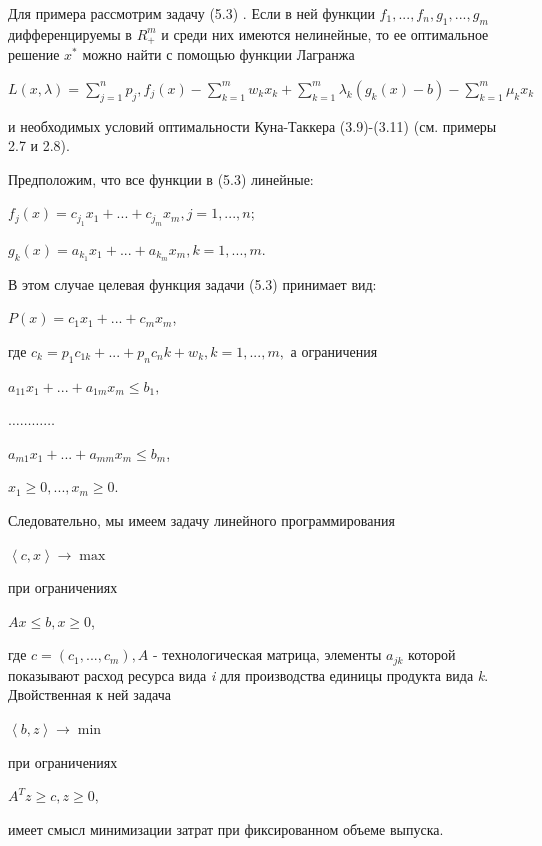 \documentclass[12pt, 4paper]{book}
\begin{document}
{Для примера рассмотрим задачу (5.3) . Если в ней функции $f_1,...,f_n,g_1,...,g_m$ дифференцируемы в $R_{+}^{m}$ и среди них имеются нелинейные, то ее оптимальное решение $x^{*}$ можно найти с помощью функции Лагранжа 
\begin{center}
$L(x,\lambda)=\sum\limits_{j=1}^{n}p_j,f_j(x) - \sum\limits_{k=1}^{m}w_k x_k + \sum\limits_{k=1}^{m}\lambda_k (g_k(x)-b)-\sum\limits_{k=1}^{m}\mu_k x_k$
\end{center}
и необходимых условий оптимальности Куна-Таккера (3.9)-(3.11) (см. примеры 2.7 и 2.8). 
\par

Предположим, что все функции в (5.3) линейные: 
\begin{center}
$f_j(x)=c_{j_1}x_1 + ... + c_{j_m} x_m,j=1,...,n$;
\end{center}
\begin{center}
$g_k(x)=a_{k_1}x_1 + ... + a_{k_m}x_m,k=1,...,m$.
\end{center}
\par

В этом случае целевая функция задачи (5.3) принимает вид: 
\par

\begin{center}
$P(x)=c_1 x_1 + ... + c_m x_m$,
\end{center}
где $c_k = p_1 c_{1k}+ ... + p_n c_nk + w_k, k=1,...,m,$ а ограничения
\begin{center}
$a_11 x_1 + ... + a_{1m} x_m \leq b_1,$
\end{center}
\begin{center}
$\ldots \ldots \ldots \ldots $
\end{center}
\begin{center}
$a_{m1}x_1 + ... + a_{mm}x_m \leq b_m$, 
\end{center}
\begin{center}
$x_1 \geq 0,...,x_m \geq 0$.
\end{center}
\par

Следовательно, мы имеем задачу линейного программирования 
\begin{center}
$\left\langle c,x \right\rangle \rightarrow \max$
\end{center}
при ограничениях
\begin{center}
$Ax \leq b, x \geq 0$,
\end{center}
где $c=(c_1,...,c_m),A$ - технологическая матрица, элементы $a_{jk}$ которой показывают расход ресурса вида \textit{i} для производства единицы продукта вида \textit{k}. Двойственная к ней задача 
\begin{center}
$\left\langle b,z \right\rangle \rightarrow \min$
\end{center}
при ограничениях
\begin{center}
$A^{T}z \geq c,z \geq 0,$
\end{center}
имеет смысл минимизации затрат при фиксированном объеме выпуска.
\newpage

}
\end{document}
